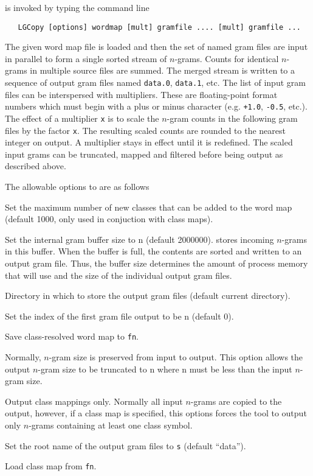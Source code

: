  is invoked by typing the command line
\begin{verbatim}
   LGCopy [options] wordmap [mult] gramfile .... [mult] gramfile ...
\end{verbatim}
The given word map file is loaded and then the set of named gram files
are input in parallel to form a single sorted stream of $n$-grams. Counts
for identical $n$-grams in multiple source files are summed.  The merged
stream is written to a sequence of output gram files named
\texttt{data.0}, \texttt{data.1}, etc. The list of input gram files
can be interspersed with multipliers. These are floating-point format
numbers which must begin with a plus or minus character
(e.g. \texttt{+1.0}, \texttt{-0.5}, etc.). The effect of a multiplier
\texttt{x} is to scale the $n$-gram counts in the following gram files by
the factor \texttt{x}. The resulting scaled counts are rounded to the
nearest integer on output. A multiplier stays in effect until it is
redefined. The scaled input grams can be truncated, mapped and
filtered before being output as described above.

The allowable options to  are as follows

\begin{optlist}

   Set the maximum number of new classes that can be
   added to the word map (default 1000, only used in conjuction with
   class maps).

   Set the internal gram buffer size to n (default
   2000000).  stores incoming $n$-grams in this buffer.
   When the buffer is full, the contents are sorted and written to an
   output gram file. Thus, the buffer size determines the amount of
   process memory that  will use and the size of the
   individual output gram files.

   Directory in which to store the output gram files
   (default current directory).

   Set the index of the first gram file output to be n
   (default 0).

   Save class-resolved word map to \texttt{fn}.

   Normally, $n$-gram size is preserved from input to
   output.  This option allows the output $n$-gram size to be truncated
   to n where n must be less than the input $n$-gram size.

   Output class mappings only. Normally all input $n$-grams
   are copied to the output, however, if a class map is specified, this
   options forces the tool to output only $n$-grams containing at least
   one class symbol.

   Set the root name of the output gram files to
   \texttt{s} (default ``data'').

   Load class map from \texttt{fn}.

\end{optlist}


